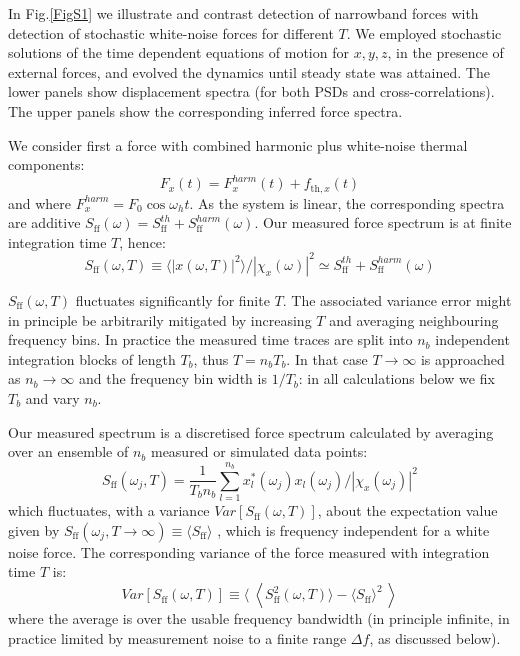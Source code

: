 \documentclass[twocolumn,english,notitlepage,superscriptaddress,nofootinbib]{revtex4-2}
\begin{document}
In Fig.\ref{FigS1}  we illustrate and contrast detection of  narrowband forces with detection of  stochastic white-noise forces
for different $T$. 
 We employed stochastic solutions of the time dependent equations of motion for $x,y,z$, in the presence of external forces, and  evolved the dynamics until steady state was attained.  The lower panels show displacement spectra (for both PSDs and cross-correlations).  The upper panels show the corresponding inferred force spectra.
 
We consider first a force with combined  harmonic plus white-noise thermal components: 
 \begin{equation} \label{Fharm}
 F_x(t)=F_x^{harm}(t)+ f_{\text{th},x}(t)
 \end{equation}
and where $F_x^{harm}= F_0 \cos \omega_h t$.  As the system is linear, the corresponding spectra are additive
 $S_{\text{ff}} (\omega)= S^{th}_{\text{ff}}+ S^{harm}_{\text{ff}} (\omega)$.
 Our measured force spectrum is at finite integration time $T$, hence: 
\begin{equation}
S_{\text{ff}}(\omega,T) \equiv \langle |x(\omega,T)|^2\rangle / |\chi_x(\omega)|^2 \simeq S^{th}_{\text{ff}}+ S^{harm}_{\text{ff}} (\omega)
\end{equation}

$S_{\text{ff}}(\omega,T)$ fluctuates significantly for finite $T$.  The associated variance error might in principle be arbitrarily mitigated by increasing $T$ and averaging neighbouring frequency bins.
 In practice  the measured time traces are split into  $n_b$ independent integration blocks of length $T_b$, thus $T=n_bT_b$. In that case $T\to \infty $ is approached as $n_b \to \infty$ and the frequency bin width is $1/T_b$: in all calculations below we fix $T_b$ and vary $n_b$.

Our measured spectrum is a discretised  force spectrum calculated by averaging over an ensemble of $n_b$
measured or simulated data points:
\begin{equation}
S_{\text{ff}}(\omega_j,T)= \frac{1}{T_bn_b}  \sum_{l=1}^{n_b}     x_l^*(\omega_j) x_l(\omega_j)/|\chi_x(\omega_j)|^2
\end{equation}
which fluctuates, with a variance $Var[S_{\text{ff}}(\omega,T)] $,  about the expectation value given by
 $S_{\text{ff}}(\omega_j,T\to \infty) \equiv \langle S_{\text{ff}}\rangle$ , which is frequency independent for a white noise force.  The corresponding variance of the force measured with integration time $T$ is:
\begin{equation}
Var[S_{\text{ff}}(\omega,T)] \equiv \langle \  \left\langle S^{2}_{\text{ff}}(\omega,T)\rangle- \langle S_{\text{ff}}\rangle^2  \ \right\rangle
\end{equation}
where the average is over the usable frequency bandwidth (in principle infinite,  in practice limited by measurement noise to a  finite range $\Delta f$,  as discussed below).
\end{document}
